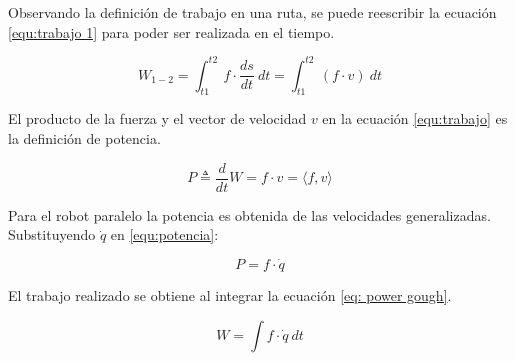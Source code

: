 Observando la definición de trabajo en una ruta, se puede reescribir la ecuación \eqref{equ:trabajo 1} para poder ser realizada en el tiempo.

\begin{equation}\label{equ:trabajo}
W_{1-2} = \int_{t1}^{t2} \ f \cdot \frac{ds}{dt} \ dt = \int_{t1}^{t2} \ (f \cdot v) \ dt
\end{equation}

El producto de la fuerza y el vector de velocidad $v$ en la ecuación \eqref{equ:trabajo} es la definición de potencia.

\begin{equation} \label{equ:potencia}
P \triangleq \frac{d}{dt}W = f \cdot v = \langle f,v \rangle
\end{equation}

Para el robot paralelo la potencia es obtenida de las velocidades generalizadas.
Substituyendo $\dot q$ en \eqref{equ:potencia}:

\begin{equation}\label{eq: power gough}
P = f \cdot \dot{q}
\end{equation}

El trabajo realizado se obtiene al integrar la ecuación \eqref{eq: power gough}.

\begin{equation}\label{equ:trabajo-plat}
W = \int f \cdot \dot{q}\ dt
\end{equation}
